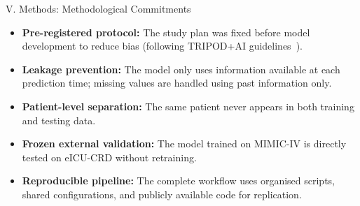 \begin{frame}{V. Methods: Methodological Commitments}
\begin{itemize}\itemsep4pt
  \item \textbf{Pre-registered protocol:} The study plan was fixed before
        model development to reduce bias (following TRIPOD+AI
        guidelines~\cite{collins2024tripodai}).
  \item \textbf{Leakage prevention:} The model only uses information
        available at each prediction time; missing values are handled using
        past information only.
  \item \textbf{Patient-level separation:} The same patient never appears in
        both training and testing data.
  \item \textbf{Frozen external validation:} The model trained on MIMIC-IV
        is directly tested on eICU-CRD without retraining.
  \item \textbf{Reproducible pipeline:} The complete workflow uses organised
        scripts, shared configurations, and publicly available code for
        replication.
\end{itemize}
\end{frame}
